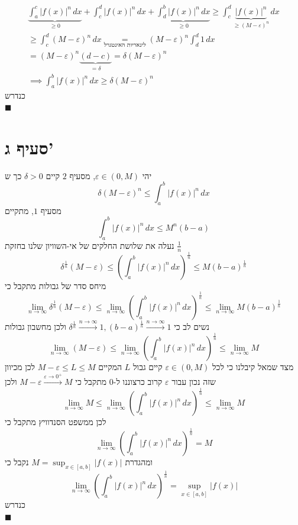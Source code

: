 \documentclass[12pt, titlepage]{article}
\begin{document}
\begin{gather*}
\underbrace{ \int_{a}^{c} \left| f\left( x \right)  \right| ^{n} \, dx  }_{ \geq 0 } + \int_{c}^{d} \left| f\left( x \right)  \right|^{n}  \, dx  + \underbrace{ \int_{d}^{b} \left| f\left( x \right)  \right| ^{n} \, dx   }_{ \geq 0 }\geq \int_{c}^{d} \underbrace{ \left| f\left( x \right)  \right| ^{n} }_{ \geq \left( M-\varepsilon \right)^{n} }  \, dx  \\
\geq \int_{c}^{d} \left( M-\varepsilon \right) ^{n} \, dx \underset{ \text{לינאריות האינטגרל} }{ = } \left( M-\varepsilon \right) ^{n}\int_{d}^{d} 1 \, dx  \\
= \left( M-\varepsilon \right)^{n} \underbrace{ \left( d-c \right) }_{ =\delta }  = \delta \left( M-\varepsilon \right) ^{n} \\
\implies \boxed{\int_{a}^{b} \left| f\left( x \right)  \right| ^{n} \, dx \geq \delta \left( M-\varepsilon \right)^{n} }
\end{gather*}
כנדרש\\
$\blacksquare$
\section*{סעיף ג'}
יהי $\varepsilon \in \left( 0,M \right)$, מסעיף $2$ קיים $\delta>0$ כך ש
$$
	\delta \left( M-\varepsilon \right) ^{n}\leq \int_{a}^{b} \left| f\left( x \right)  \right| ^{n} \, dx 
$$
מסעיף $1$, מתקיים 
$$
	\int_{a}^{b} \left| f\left( x \right) \right|^{n}  \, dx \leq M^{n}\left(  b-a\right)
$$
נעלה את שלושת החלקים של אי-השוויון שלנו בחזקת $\frac{1}{n}$
$$
	\delta^{\frac{1}{n}}\left( M-\varepsilon \right) \leq \left( \int_{a}^{b} \left| f\left( x \right)  \right| ^{n} \, dx  \right)^{\frac{1}{n}}\leq M\left( b-a\right)^{\frac{1}{n}}
$$
מיחס סדר של גבולות מתקבל כי
$$
	\lim_{ n \to \infty } 	\delta^{\frac{1}{n}}\left( M-\varepsilon \right) \leq \lim_{ n \to \infty } \left( \int_{a}^{b} \left| f\left( x \right)  \right| ^{n} \, dx  \right)^{\frac{1}{n}} \leq \lim_{ n \to \infty }M\left( b-a\right)^{\frac{1}{n}}
$$
נשים לב כי $\delta^{\frac{1}{n}}\xrightarrow{ n\to \infty }1,\left( b-a \right)^{\frac{1}{n}}\xrightarrow{ n\to \infty }1$ ולכן מחשבון גבולות
$$
		\lim_{ n \to \infty } \left( M-\varepsilon \right) \leq \lim_{ n \to \infty } \left( \int_{a}^{b} \left| f\left( x \right)  \right| ^{n} \, dx  \right)^{\frac{1}{n}} \leq \lim_{ n \to \infty }M
$$
מצד שמאל קיבלנו כי לכל $\varepsilon \in \left( 0,M \right)$ קיים גבול $L$ המקיים $M-\varepsilon\leq L\leq M$ לכן מכיוון שזה נכון עבור $\varepsilon$ קרוב כרצוננו ל-$0$ מתקבל כי $M-\varepsilon \xrightarrow{ \varepsilon\to0^{+} }M$ ולכן
$$
	\lim_{ n \to \infty } M\leq  \lim_{ n \to \infty } \left( \int_{a}^{b} \left| f\left( x \right)  \right| ^{n} \, dx  \right)^{\frac{1}{n}} \leq \lim_{ n \to \infty } M
$$
לכן ממשפט הסנדוויץ מתקבל כי
$$
  \lim_{ n \to \infty } \left( \int_{a}^{b} \left| f\left( x \right)  \right| ^{n} \, dx  \right)^{\frac{1}{n}} = M
$$
ומהגדרת $M=\sup_{x \in \left[ a,b \right]}\left| f\left( x \right) \right|$ נקבל כי 
$$
 \boxed{ \lim_{ n \to \infty } \left( \int_{a}^{b} \left| f\left( x \right)  \right| ^{n} \, dx  \right)^{\frac{1}{n}} = \sup_{x \in \left[ a,b \right] }\left| f\left( x \right)  \right| }
$$
כנדרש\\
$\blacksquare$
\end{document}
